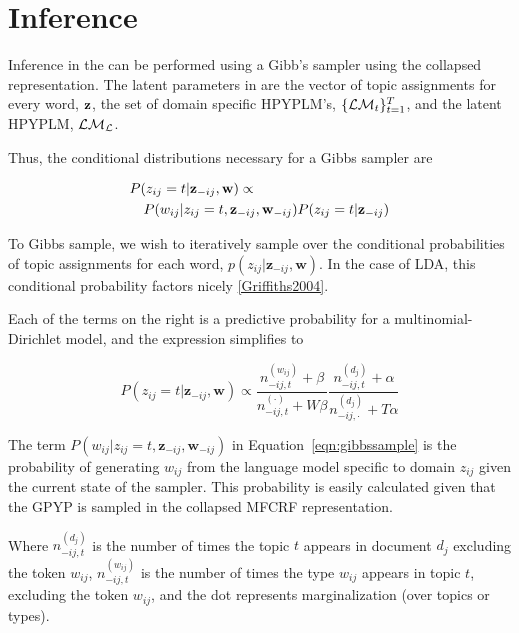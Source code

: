 \section{Inference}

Inference in the \ourmodel can be performed using a Gibb's sampler using the collapsed representation.  The latent parameters in \ourmodel are the vector of topic assignments for every word, ${\bf z}$,  the set of domain specific HPYPLM's, $\{ \LM_t \}_{t = 1}^T$, and the latent HPYPLM, $\LM_\LA$.  

Thus, the conditional distributions necessary for a Gibbs sampler are

\begin{eqnarray}
\lefteqn{P(z_{ij}=t | \mathbf{z}_{-ij},\mathbf{w}) \propto}  \nonumber \\
 & &  P(w_{ij}|z_{ij}=t, \mathbf{z}_{-ij}, \mathbf{w}_{-ij})P(z_{ij} = t | \mathbf{z}_{-ij}) \label{eqn:gibbssample} \nonumber
\end{eqnarray}


To Gibbs sample, we wish to iteratively sample over the conditional probabilities of topic assignments for each word, $p(z_{ij}|\mathbf{z}_{-ij},\mathbf{w})$.  In the case of LDA, this conditional probability factors nicely \ref{Griffiths2004}.


Each of the terms on the right is a predictive probability for a multinomial-Dirichlet model, and the expression simplifies to

\begin{equation}
P(z_{ij}=t | \mathbf{z}_{-ij},\mathbf{w}) \propto \frac{n^{(w_{ij})}_{-ij,t} + \beta}{n^{(\cdot)}_{-ij,t} + W\beta} \frac{n^{(d_j)}_{-ij,t} + \alpha}{n^{(d_j)}_{-ij,\cdot} + T\alpha} 
\end{equation}

The term $P(w_{ij}|z_{ij}=t, \mathbf{z}_{-ij}, \mathbf{w}_{-ij})$ in Equation~\ref{eqn:gibbssample} is the probability of generating $w_{ij}$ from the language model specific to domain $z_{ij}$ given the current state of the sampler.  This probability is easily calculated given that the GPYP is sampled in the collapsed MFCRF representation.

Where $n^{(d_j)}_{-ij,t}$ is the number of times the topic $t$ appears in document $d_j$ excluding the token $w_{ij}$, $n^{(w_{ij})}_{-ij,t}$ is the number of times the type $w_{ij}$ appears in topic $t$, excluding the token $w_{ij}$, and the dot represents marginalization (over topics or types).

